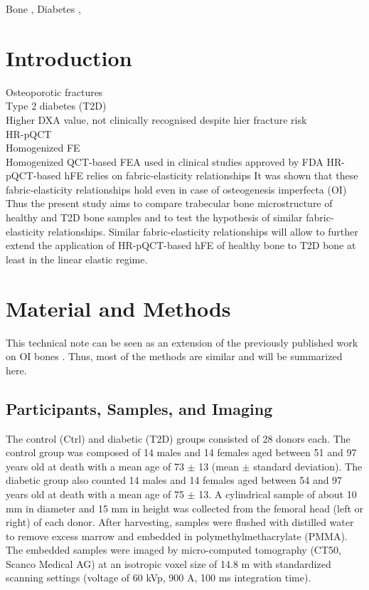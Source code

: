 \documentclass[a4paper,fleqn]{DC_ArtStyle}
\begin{document}
	\begin{keywords}
		Bone \sep%
		Diabetes \sep%
	\end{keywords}
	

	\begin{NoHyper}
		\maketitle
	\end{NoHyper}
	
	
	\section{Introduction}
	Osteoporotic fractures\\
	Type 2 diabetes (T2D)\\
	Higher DXA value, not clinically recognised despite hier fracture risk\\
	HR-pQCT\\
	Homogenized FE\\
	Homogenized QCT-based FEA used in clinical studies approved by FDA
	HR-pQCT-based hFE relies on fabric-elasticity relationships
	It was shown that these fabric-elasticity relationships hold even in case of osteogenesis imperfecta (OI)
	Thus the present study aims to compare trabecular bone microstructure of healthy and T2D bone samples and to test the hypothesis of similar fabric-elasticity relationships.
	Similar fabric-elasticity relationships will allow to further extend the application of HR-pQCT-based hFE of healthy bone to T2D bone at least in the linear elastic regime.

	
	\section{Material and Methods}
	This technical note can be seen as an extension of the previously published work on OI bones \cite{Simon2022}.
	Thus, most of the methods are similar and will be summarized here.
	
	\subsection{Participants, Samples, and Imaging}
	The control (Ctrl) and diabetic (T2D) groups consisted of 28 donors each.
	The control group was composed of 14 males and 14 females aged between 51 and 97 years old at death with a mean age of 73 $\pm$ 13 (mean $\pm$ standard deviation).
	The diabetic group also counted 14 males and 14 females aged between 54 and 97 years old at death with a mean age of 75 $\pm$ 13.
	A cylindrical sample of about 10 mm in diameter and 15 mm in height was collected from the femoral head (left or right) of each donor.
	After harvesting, samples were flushed with distilled water to remove excess marrow and embedded in polymethylmethacrylate (PMMA).
	The embedded samples were imaged by micro-computed tomography (\textmu CT50, Scanco Medical AG) at an isotropic voxel size of 14.8 \textmu m with standardized scanning settings (voltage of 60 kVp, 900 \textmu A, 100 ms integration time).
\end{document}
